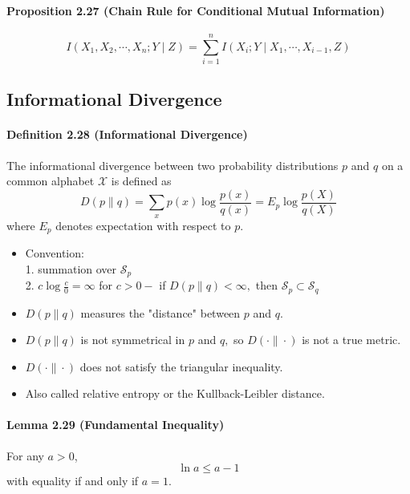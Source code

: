 \documentclass[8pt]{article}
\begin{document}
\begin{tcolorbox}
\paragraph{Proposition 2.27 (Chain Rule for Conditional Mutual Information)}
$$
I\left(X_{1}, X_{2}, \cdots, X_{n} ; Y \mid Z\right)=\sum_{i=1}^{n} I\left(X_{i} ; Y \mid X_{1}, \cdots, X_{i-1}, Z\right)
$$
\end{tcolorbox}

\subsection{Informational Divergence}
\begin{tcolorbox}
\paragraph{Definition 2.28 (Informational Divergence)} The informational divergence between two probability distributions $p$ and $q$ on a common alphabet $\mathcal{X}$ is defined as
$$
D(p \| q)=\sum_{x} p(x) \log \frac{p(x)}{q(x)}=E_{p} \log \frac{p(X)}{q(X)}
$$
where $E_{p}$ denotes expectation with respect to $p$.
\end{tcolorbox}

\begin{itemize}
	\item Convention: \\
	1. summation over $\mathcal{S}_{p}$\\
	2. $c \log \frac{c}{0}=\infty$ for $c>0-$ if $D(p \| q)<\infty,$ then $\mathcal{S}_{p} \subset \mathcal{S}_{q}$
	\item $D(p \| q)$ measures the "distance" between $p$ and $q$.
	\item $D(p \| q)$ is not symmetrical in $p$ and $q,$ so $D(\cdot \| \cdot)$ is not a true metric.
	\item $D(\cdot \| \cdot)$ does not satisfy the triangular inequality.
	\item Also called relative entropy or the Kullback-Leibler distance.
\end{itemize}

\begin{tcolorbox}
\paragraph{Lemma 2.29 (Fundamental Inequality)} For any $a>0$,
$$
\ln a \leq a-1
$$
with equality if and only if $a=1$.
\end{tcolorbox}
\end{document}
